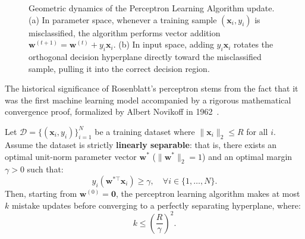 \begin{figure}[H]
\begin{minipage}{0.48\linewidth}
\end{minipage}
\caption{Geometric dynamics of the Perceptron Learning Algorithm update. (a) In parameter space, whenever a training sample $(\mathbf{x}_i, y_i)$ is misclassified, the algorithm performs vector addition $\mathbf{w}^{(t+1)} = \mathbf{w}^{(t)} + y_i \mathbf{x}_i$. (b) In input space, adding $y_i \mathbf{x}_i$ rotates the orthogonal decision hyperplane directly toward the misclassified sample, pulling it into the correct decision region.}
\label{fig:perceptron_learning_dynamics}
\end{figure}

The historical significance of Rosenblatt's perceptron stems from the fact that it was the first machine learning model accompanied by a rigorous mathematical convergence proof, formalized by Albert Novikoff in 1962~\cite{novikoff1962convergence}.

\begin{theorem}
\label{thm:novikoff_convergence}
Let $\mathcal{D} = \{(\mathbf{x}_i, y_i)\}_{i=1}^N$ be a training dataset where $\|\mathbf{x}_i\|_2 \le R$ for all $i$. Assume the dataset is strictly \textbf{linearly separable}: that is, there exists an optimal unit-norm parameter vector $\mathbf{w}^*$ ($\|\mathbf{w}^*\|_2 = 1$) and an optimal margin $\gamma > 0$ such that:
\begin{equation}
y_i (\mathbf{w}^{*\top} \mathbf{x}_i) \ge \gamma, \quad \forall i \in \{1, \dots, N\}.
\label{eq:linear_separability_condition}
\end{equation}
Then, starting from $\mathbf{w}^{(0)} = \mathbf{0}$, the perceptron learning algorithm makes at most $k$ mistake updates before converging to a perfectly separating hyperplane, where:
\begin{equation}
k \le \left( \frac{R}{\gamma} \right)^2.
\label{eq:novikoff_bound}
\end{equation}
\end{theorem}


